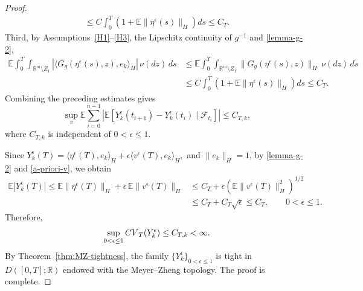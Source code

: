 \documentclass[10pt,a4paper]{amsart}
\theoremstyle{plain}
\numberwithin{equation}{section}
\begin{document}
\begin{proof}
\[\begin{aligned}
\le C\int_0^T\left(1+\mathbb E\|\eta^\epsilon(s)\|_H\right)ds \le C_T .
\end{aligned}
\]
Third, by Assumptions~\ref{H1}--\ref{H3},  the Lipschitz continuity of \(g^{-1}\) and  \eqref{lemma-g-2},
\[
\begin{aligned}
\mathbb E\int_0^T \int_{\mathbb R^m\setminus Z_1}|\langle G_g(\eta^\epsilon(s),z),e_k\rangle_H|\,\nu(dz)\,ds                                          
&\le\mathbb E\int_0^T\int_{\mathbb R^m\setminus Z_1}\|G_g(\eta^\epsilon(s),z)\|_H\,\nu(dz)\,ds              \\
&\le C\int_0^T\left(1+\mathbb E\|\eta^\epsilon(s)\|_H\right)ds \le C_T .
\end{aligned}
\]
Combining the preceding estimates gives
\[
\sup_{\pi}\mathbb E\sum_{i=0}^{n-1}\left|\mathbb E\left[ Y_k^\epsilon(t_{i+1})-Y_k^\epsilon(t_i)\mid \mathcal F_{t_i}\right]\right|\le C_{T,k},
\]
where \(C_{T,k}\) is independent of \(0<\epsilon\le1\).

Since \(Y_k^\epsilon(T)=\langle \eta^\epsilon(T),e_k\rangle_H+\epsilon\langle v^\epsilon(T),e_k\rangle_H ,\)
and \(\|e_k\|_H=1\),  by \eqref{lemma-g-2} and \eqref{a-priori-v}, we obtain
\[
\begin{aligned}
\mathbb E|Y_k^\epsilon(T)| \le \mathbb E\|\eta^\epsilon(T)\|_H+ \epsilon\,\mathbb E\|v^\epsilon(T)\|_H            
&\le C_T+\epsilon\left(\mathbb E\|v^\epsilon(T)\|_H^2\right)^{1/2}               \\
&\le C_T+C_T\sqrt{\epsilon}\le C_T , \qquad 0<\epsilon\le1 .
\end{aligned}
\]
Therefore,
\[
\sup_{0<\epsilon\le1}{\rm CV}_{T}(Y_k^\epsilon) \le C_{T,k}<\infty .
\]
By Theorem~\ref{thm:MZ-tightness}, the family \(\{Y_k^\epsilon\}_{0<\epsilon\le1}\) is tight in  \(D([0,T];\mathbb R)\) endowed with the Meyer--Zheng topology.
The proof is complete.
\end{proof}
\end{document}
